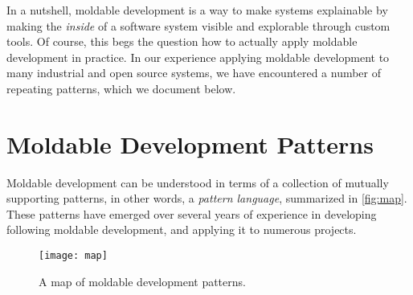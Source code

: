 \documentclass[sigconf]{acmart}
\renewcommand{\nbc}[3]{} %
\newcommand\rb[1]{\nbc{Ralf}{#1}{teal}}
\newcommand\kh[1]{\nbc{Konrad}{#1}{violet}}
\newcommand\eog[1]{\nbc{Edward}{#1}{purple}}
\newcommand{\GT}{\lst{GT}\xspace} %
\begin{document}
In a nutshell, moldable development is a way to make systems explainable by making the \emph{inside} of a software system visible and explorable through custom tools.
Of course, this begs the question how to actually apply moldable development in practice.
In our experience applying moldable development to many industrial and open source systems, we have encountered a number of repeating patterns, which we document below.

\section{Moldable Development Patterns}

\rb{In our view, the paper is weakened by the assumption that it is aimed at the same audience as the previously published paper. Your goal in the "book" was to inform GT students of the scope of possibilities in this product. We would hope that your goal in publishing samples through PLoP would be to spread your success more broadly. (Ward is thinking of sharing with him for example). }

Moldable development can be understood in terms of a collection of mutually supporting 
patterns, in other words, a \emph{pattern language}, summarized in \autoref{fig:map}.
These patterns have emerged over several years of experience in developing \GT following moldable development, and applying it to numerous projects.

\begin{figure}[h]
  \texttt{[image: map]}
  \caption{A map of moldable development patterns.}
  \label{fig:map}
\end{figure}

\kh{What is not obvious from the description of the patterns is how they
mutually support each other. There's an opportunity for a follow-up
paper that describes how the patterns are applied in a real project.}

\eog{I think like that, the hard thing for this section number two that I found is that there's like a lot of definitions of what things are without a lot of connected motivation.
And it felt like I don't know if this is a thing that you've ever experienced, but you sit down you play, you're ready to play a board game with some friends and then someone's like, all right, we're gonna sit down and read the rule book from like cover to cover and then everything will be good.
And then you've got people like me who are like, what is the point of this game?
How do I win?
And then like from that I can gather, like my, I can interest my brain in the parts that matter.
And it's really tough to hold on to just like a list of definitions, for example, without that.}
\end{document}
